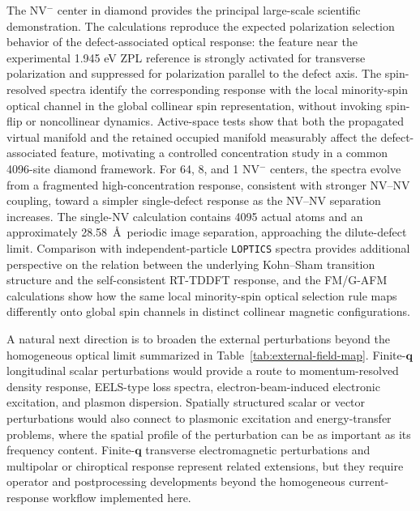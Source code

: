 \documentclass[journal=jctcce,manuscript=article,etalmode=truncate,maxauthors=10,layout=onecolumn]{achemso}
\begin{document}
The NV$^{-}$ center in diamond provides the principal large-scale
scientific demonstration.  The calculations reproduce the expected
polarization selection behavior of the defect-associated optical
response: the feature near the experimental 1.945 eV ZPL reference is
strongly activated for transverse polarization and suppressed for
polarization parallel to the defect axis.  The spin-resolved spectra
identify the corresponding response with the local minority-spin
optical channel in the global collinear spin representation, without
invoking spin-flip or noncollinear dynamics.  Active-space tests show
that both the propagated virtual manifold and the retained occupied
manifold measurably affect the defect-associated feature, motivating a
controlled concentration study in a common 4096-site diamond framework.
For 64, 8, and 1 NV$^{-}$ centers, the spectra evolve from a fragmented
high-concentration response, consistent with stronger NV--NV coupling,
toward a simpler single-defect response as the NV--NV separation
increases.  The single-NV calculation contains 4095 actual atoms and an
approximately 28.58~\AA\ periodic image separation, approaching the
dilute-defect limit.  Comparison with independent-particle
\texttt{LOPTICS} spectra provides additional perspective on the
relation between the underlying Kohn--Sham transition structure and the
self-consistent RT-TDDFT response, and the FM/G-AFM calculations show
how the same local minority-spin optical selection rule maps
differently onto global spin channels in distinct collinear magnetic
configurations.


A natural next direction is to broaden the external perturbations
beyond the homogeneous optical limit summarized in
Table~\ref{tab:external-field-map}.  Finite-$\mathbf q$ longitudinal
scalar perturbations would provide a route to momentum-resolved density
response, EELS-type loss spectra, electron-beam-induced electronic
excitation, and plasmon dispersion.  Spatially structured scalar or
vector perturbations would also connect to plasmonic excitation and
energy-transfer problems, where the spatial profile of the perturbation
can be as important as its frequency
content.\cite{JCTC-2020,tao-2021}  Finite-$\mathbf q$ transverse
electromagnetic perturbations and multipolar or chiroptical response
represent related extensions, but they require operator and
postprocessing developments beyond the homogeneous current-response
workflow implemented here.
\end{document}
